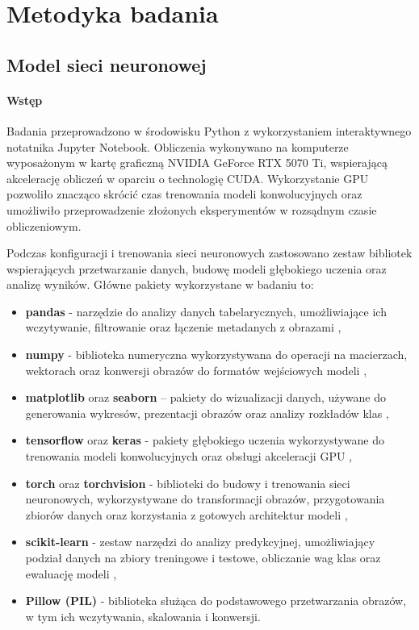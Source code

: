 
\def\filename{rozdzial4}
\chapter{Metodyka badania}

\section{Model sieci neuronowej}

\subsubsection{Wstęp}
Badania przeprowadzono w środowisku Python z wykorzystaniem interaktywnego notatnika Jupyter Notebook.
Obliczenia wykonywano na komputerze wyposażonym w kartę graficzną NVIDIA GeForce RTX 5070 Ti, wspierającą akcelerację obliczeń w oparciu o technologię CUDA. 
Wykorzystanie GPU pozwoliło znacząco skrócić czas trenowania modeli konwolucyjnych oraz umożliwiło przeprowadzenie złożonych eksperymentów w rozsądnym czasie obliczeniowym.
	
Podczas konfiguracji i trenowania sieci neuronowych zastosowano zestaw bibliotek wspierających przetwarzanie danych, budowę modeli głębokiego uczenia oraz analizę wyników. 
Główne pakiety wykorzystane w badaniu to:
\begin{itemize}
	\item \textbf{pandas} - narzędzie do analizy danych tabelarycznych, umożliwiające ich wczytywanie, filtrowanie oraz łączenie metadanych z obrazami \cite{pandas},
	\item \textbf{numpy} - biblioteka numeryczna wykorzystywana do operacji na macierzach, wektorach oraz konwersji obrazów do formatów wejściowych modeli \cite{Harris_2020},
	\item \textbf{matplotlib} oraz \textbf{seaborn} – pakiety do wizualizacji danych, używane do generowania wykresów, prezentacji obrazów oraz analizy rozkładów klas \cite{matplotlib, seaborn},
	\item \textbf{tensorflow} oraz \textbf{keras} - pakiety głębokiego uczenia wykorzystywane do trenowania modeli konwolucyjnych oraz obsługi akceleracji GPU \cite{abadi2016tensorflowlargescalemachinelearning},
	\item \textbf{torch} oraz \textbf{torchvision} - biblioteki do budowy i trenowania sieci neuronowych, wykorzystywane do transformacji obrazów, przygotowania zbiorów danych oraz korzystania z gotowych architektur modeli \cite{1874254, paszke2019pytorchimperativestylehighperformance},
	\item \textbf{scikit-learn} - zestaw narzędzi do analizy predykcyjnej, umożliwiający podział danych na zbiory treningowe i testowe, obliczanie wag klas oraz ewaluację modeli \cite{pedregosa2018scikitlearnmachinelearningpython},
	\item \textbf{Pillow (PIL)} - biblioteka służąca do podstawowego przetwarzania obrazów, w tym ich wczytywania, skalowania i konwersji.
\end{itemize}

